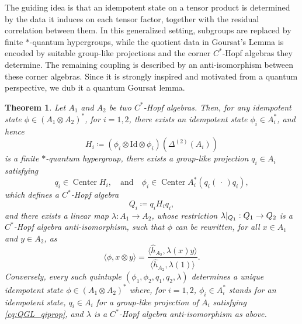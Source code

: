 \documentclass[a4paper,10pt]{amsart}
\newcommand{\eval}[2]{\langle #1 , #2\rangle}
\newcommand{\placeholder}{\,\cdot\,}
\newtheorem{theorem}{Theorem}[section]
\theoremstyle{definition}
\begin{document}
The guiding idea is that an idempotent state on a tensor product is determined by the data it induces on each tensor factor, together with the residual correlation between them. In this generalized setting, subgroups are replaced by finite $*$-quantum hypergroups, while the quotient data in Goursat's Lemma is encoded by suitable group-like projections and the corner $C^*$-Hopf algebras they determine. The remaining coupling is described by an anti-isomorphism between these corner algebras. Since it is strongly inspired and motivated from a quantum perspective, we dub it a quantum Goursat lemma.


\begin{theorem}
    \label{thm:QuantumGoursat}
    Let $A_1$ and $A_2$ be two $C^*$-Hopf algebras.
    Then, for any idempotent state $\phi\in (A_1 \otimes A_2)^*$, for $i=1,2$, there exists an idempotent state $\phi_i\in A_i^*$, and hence
    \[
        H_i \coloneqq (\phi_i\otimes\mathrm{Id}\otimes\phi_i)(\Delta^{(2)}(A_i))
    \]
    is a finite $*$-quantum hypergroup,
    there exists a group-like projection $q_i\in A_i$ satisfying
    \begin{equation}\label{eq:QGL_qiprop}
        q_i \in \operatorname{Center}H_i, \quad\text{and}\quad
        \phi_i \in \operatorname{Center} A_i^* (q_i(\placeholder)q_i),
    \end{equation}
    which defines a $C^*$-Hopf algebra
    \begin{equation}
        Q_i \coloneqq q_i H_i q_i,
    \end{equation}
    and there exists a linear map $\lambda:A_1 \to A_2$, whose restriction $\lambda|_{\smash{Q_1}}:Q_1 \to Q_2$ is a $C^*$-Hopf al\-ge\-bra anti-isomorphism,
    such that $\phi$ can be rewritten, for all $x\in A_1$ and $y\in A_2$, as 
    \begin{equation}
        \eval{\phi}{x\otimes y}
        =
        \frac{\eval{\hat{h}_{A_2}}{\lambda (x)y}}{\eval{\hat{h}_{A_2}}{\lambda(1)}}.
    \end{equation}
    Conversely, every such quintuple $(\phi_1, \phi_2, q_1, q_2, \lambda)$ determines a unique idempotent state $\phi \in (A_1 \otimes A_2)^*$ where, for $i=1,2$, $\phi_i\in A_i^*$ stands for an idempotent state, $q_i\in A_i$ for a group-like projection of $A_i$ satisfying \cref{eq:QGL_qiprop}, and $\lambda$ is a $C^*$-Hopf algebra anti-isomorphism as above.
\end{theorem}
\end{document}
